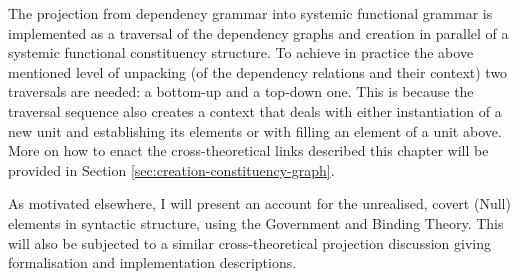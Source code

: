     The projection from dependency grammar into systemic functional grammar is implemented as a traversal of the dependency graphs and creation in parallel of a systemic functional constituency structure. To achieve in practice the above mentioned level of unpacking (of the dependency relations and their context) two traversals are needed: a bottom-up and a top-down one. This is because the traversal sequence also creates a context that deals with either instantiation of a new unit and establishing its elements or with filling an element of a unit above. More on how to enact the cross-theoretical links described this chapter will be provided in Section \ref{sec:creation-constituency-graph}.


    As motivated elsewhere, I will present an account for the unrealised, covert (Null) elements in syntactic structure, using the Government and Binding Theory. This will also be subjected to a similar cross-theoretical projection discussion giving formalisation and implementation descriptions.

%
%
%
